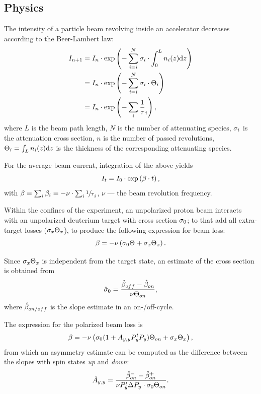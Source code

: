 \documentclass[reprint]{revtex4-1}
\newcommand{\td}{\mathrm{d}}
\begin{document}
\subsection{Physics}
The intensity of a particle beam revolving inside an accelerator decreases according to the Beer-Lambert law:
\begin{align*}
	I_{n+1} &= I_n \cdot \exp\bkt{-\sum_{i=i}^N \CS[i]\cdot\int_0^L n_i(z)\td z} \\
			&= I_n \cdot \exp\bkt{-\sum_{i=i}^N \CS[i]\cdot \Thick[i]} \\
			&= I_n \cdot \exp\bkt{-\sum_i\frac1\tau_i},
\end{align*}
where $L$ is the beam path length, $N$ is the number of attenuating species, $\CS[i]$ is the attenuation cross section, $n$ is the number of passed revolutions, $\Thick[i] = \int_L n_i(z)\td z$ is the thickness of the corresponding attenuating species.

For the average beam current, integration of the above yields
\begin{equation}\label{eq:CurrentDecay}
	I_t = I_0 \cdot \exp\bkt{\slp\cdot t},
\end{equation}
with $\slp = \sum_i \slp[i] = - \nu\cdot\sum_i \sfrac1\tau_i$, $\nu$ --- the beam revolution frequency. 

Within the confines of the experiment, an unpolarized proton beam interacts with an unpolarized deuterium target with cross section $\CS[0]$; to that add all extra-target losses ($\CS[x]\Thick[x]$), to produce the following expression for beam loss:
\begin{equation}\label{eq:SlopeModel}
	\slp = -\nu\bkt{\CS[0]\Thick + \CS[x]\Thick[x]}.
\end{equation}

Since $\CS[x]\Thick[x]$ is independent from the target state, an estimate of the cross section is obtained from  
\begin{equation}
	\CS*[0] = \frac{\slp*[off] - \slp*[on]}{\nu\Thick[on]},
\end{equation}
where $\slp*[on/off]$ is the slope estimate in an on-/off-cycle.

The expression for the polarized beam loss is 
\[
	\slp = -\nu\bkt{\CS[0](1 + \Ayy P_y^t P_y)\Thick[on] + \CS[x]\Thick[x]},
\]
from which an asymmetry estimate can be computed as the difference between the slopes with spin states \emph{up} and \emph{down}:
\[
	\Ayy* = \frac{\slp*[on]^- - \slp*[on]^+}{\nu P_y^t\Delta P_y\cdot \CS[0]\Thick[on]}.
\]
\end{document}
